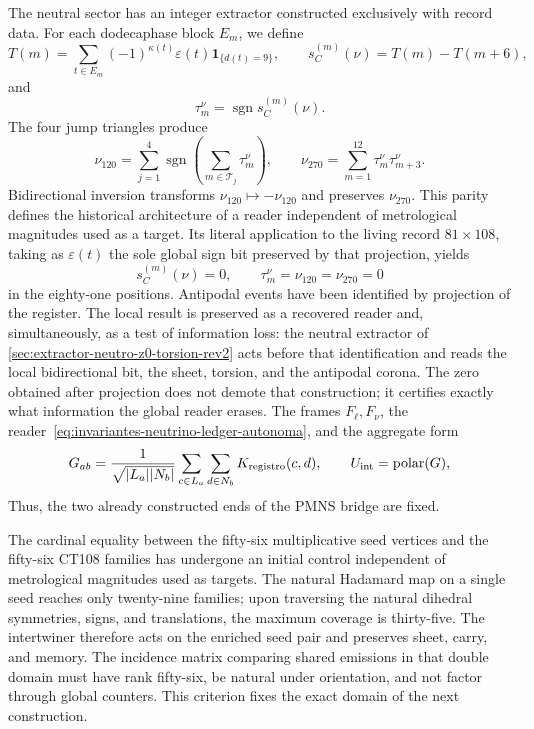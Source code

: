 The neutral sector has an integer extractor constructed exclusively
with record data. For each dodecaphase block \(E_m\), we define
\begin{equation}
 T(m)=\sum_{t\in E_m}(-1)^{\kappa(t)}\varepsilon(t)
       \mathbf1_{\{d(t)=9\}},
 \qquad
 s_C^{(m)}(\nu)=T(m)-T(m+6),
 \label{eq:lector-neutrino-ledger-autonoma}
\end{equation}
and
\begin{equation}
 \tau_m^\nu=\operatorname{sgn}s_C^{(m)}(\nu).
 \label{eq:trit-neutrino-ledger-autonoma}
\end{equation}
The four jump triangles produce
\begin{equation}
 \nu_{120}=\sum_{j=1}^{4}
 \operatorname{sgn}\!\left(\sum_{m\in\mathcal T_j}\tau_m^\nu\right),
 \qquad
 \nu_{270}=\sum_{m=1}^{12}\tau_m^\nu\tau_{m+3}^\nu.
 \label{eq:invariantes-neutrino-ledger-autonoma}
\end{equation}
Bidirectional inversion transforms
\(\nu_{120}\mapsto-\nu_{120}\) and preserves \(\nu_{270}\). This parity
defines the historical architecture of a reader independent of metrological
magnitudes used as a target. Its literal application
to the living record \(81\times108\), taking as
\(\varepsilon(t)\) the sole global sign bit preserved by that
projection, yields
\[
 s_C^{(m)}(\nu)=0,
 \qquad \tau_m^\nu=\nu_{120}=\nu_{270}=0
\]
in the eighty-one positions. Antipodal events have been
identified by projection of the register. The local result is preserved
as a recovered reader and, simultaneously, as a test of information loss: the
neutral extractor of
\cref{sec:extractor-neutro-z0-torsion-rev2} acts before that
identification and reads the local bidirectional bit, the sheet, torsion, and the
antipodal corona. The zero obtained after projection does not demote that
construction; it certifies exactly what information the global reader erases.
The frames
\(F_\ell,F_\nu\), the reader~\eqref{eq:invariantes-neutrino-ledger-autonoma},
and the aggregate form
\begin{equation}
 G_{ab}=\frac1{\sqrt{|L_a||N_b|}}
 \sum_{c\in L_a}\sum_{d\in N_b}K_{\rm registro}(c,d),
 \qquad U_{\rm int}=\operatorname{polar}(G),
 \label{eq:kernel-ledger-pmns-autonoma}
\end{equation}
Thus, the two already constructed ends of the PMNS bridge are fixed.

The cardinal equality between the fifty-six multiplicative seed vertices and the fifty-six CT108 families has undergone an initial control independent of metrological magnitudes used as targets. The natural Hadamard map on a single seed reaches only twenty-nine families; upon traversing the natural dihedral symmetries, signs, and translations, the maximum coverage is thirty-five. The intertwiner therefore acts on the enriched seed pair and preserves sheet, carry, and memory. The incidence matrix comparing shared emissions in that double domain must have rank fifty-six, be natural under orientation, and not factor through global counters. This criterion fixes the exact domain of the next construction.
